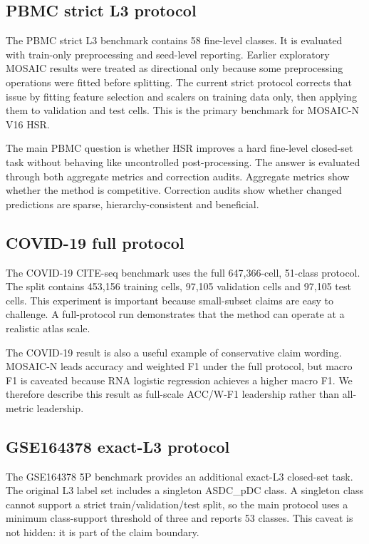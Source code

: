 \documentclass[unnumsec,webpdf,contemporary,large,numbered]{oup-authoring-template}
\begin{document}
\subsection{PBMC strict L3 protocol}

The PBMC strict L3 benchmark contains 58 fine-level classes. It is evaluated with train-only preprocessing and seed-level reporting. Earlier exploratory MOSAIC results were treated as directional only because some preprocessing operations were fitted before splitting. The current strict protocol corrects that issue by fitting feature selection and scalers on training data only, then applying them to validation and test cells. This is the primary benchmark for MOSAIC-N V16 HSR.

The main PBMC question is whether HSR improves a hard fine-level closed-set task without behaving like uncontrolled post-processing. The answer is evaluated through both aggregate metrics and correction audits. Aggregate metrics show whether the method is competitive. Correction audits show whether changed predictions are sparse, hierarchy-consistent and beneficial.

\subsection{COVID-19 full protocol}

The COVID-19 CITE-seq benchmark uses the full 647,366-cell, 51-class protocol. The split contains 453,156 training cells, 97,105 validation cells and 97,105 test cells. This experiment is important because small-subset claims are easy to challenge. A full-protocol run demonstrates that the method can operate at a realistic atlas scale.

The COVID-19 result is also a useful example of conservative claim wording. MOSAIC-N leads accuracy and weighted F1 under the full protocol, but macro F1 is caveated because RNA logistic regression achieves a higher macro F1. We therefore describe this result as full-scale ACC/W-F1 leadership rather than all-metric leadership.

\subsection{GSE164378 exact-L3 protocol}

The GSE164378 5P benchmark provides an additional exact-L3 closed-set task. The original L3 label set includes a singleton ASDC\_pDC class. A singleton class cannot support a strict train/validation/test split, so the main protocol uses a minimum class-support threshold of three and reports 53 classes. This caveat is not hidden: it is part of the claim boundary.
\end{document}
